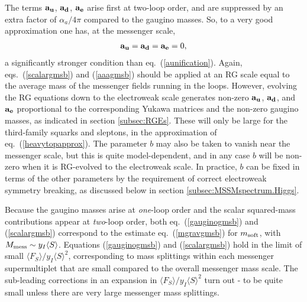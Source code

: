 \documentclass[12pt]{article}
\def\beq{\begin{eqnarray}}
\def\eeq{\end{eqnarray}}
\begin{document}
The terms $\bf a_u$, $\bf a_d$, $\bf a_e$ arise first at two-loop order, 
and are suppressed by an extra factor of $\alpha_a/4 \pi$ compared to the 
gaugino masses. So, to a very good approximation one has, at the messenger 
scale,
\beq
{\bf a_u} = {\bf a_d} = {\bf a_e} = 0,
\label{aaagmsb}
\eeq
a significantly stronger condition than eq.~(\ref{aunification}). Again, 
eqs.~(\ref{scalargmsb}) and (\ref{aaagmsb}) should be applied at an RG 
scale equal to the average mass of the messenger fields running in the 
loops. However, evolving the RG equations down to the electroweak scale 
generates non-zero $\bf a_u$, $\bf a_d$, and $\bf a_e$ proportional to the 
corresponding Yukawa matrices and the non-zero gaugino masses, as 
indicated in section \ref{subsec:RGEs}. These will only be large for the 
third-family squarks and sleptons, in the approximation of 
eq.~(\ref{heavytopapprox}). The parameter $b$ may also be taken to vanish 
near the messenger scale, but this is quite model-dependent, and in any 
case $b$ will be non-zero when it is RG-evolved to the electroweak scale. 
In practice, $b$ can be fixed in terms of the other parameters
by the requirement of correct electroweak 
symmetry breaking, as discussed below in section 
\ref{subsec:MSSMspectrum.Higgs}.

Because the gaugino masses arise at {\it one}-loop order and the scalar 
squared-mass contributions appear at {\it two}-loop order, both 
eq.~(\ref{gauginogmsb}) and (\ref{scalargmsb}) correspond to the estimate 
eq.~(\ref{mgravgmsb}) for $m_{\rm soft}$, with $M_{\rm mess} \sim y_I 
\langle S \rangle$. Equations (\ref{gauginogmsb}) and (\ref{scalargmsb}) 
hold in the limit of small $\langle F_S \rangle /y_I\langle S \rangle^2$, 
corresponding to mass splittings within each messenger supermultiplet that 
are small compared to the overall messenger mass scale. The sub-leading 
corrections in an expansion in $\langle F_S \rangle /y_I\langle S 
\rangle^2$ turn out \cite{gmsbcorrA}-\cite{gmsbcorrC} 
to be quite small unless there 
are very large messenger mass splittings.
\end{document}
